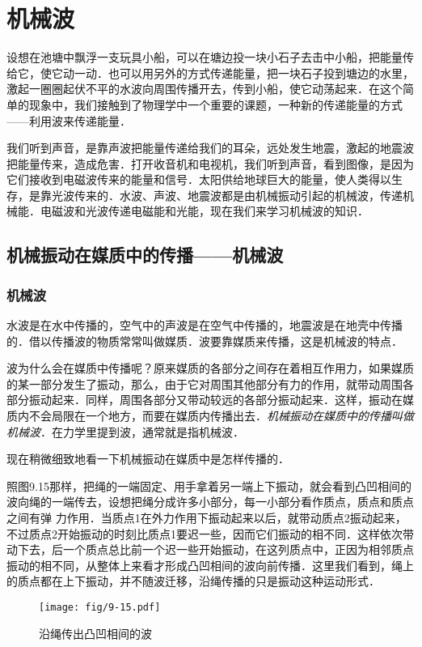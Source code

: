 \section{机械波}
设想在池塘中飘浮一支玩具小船，可以在塘边投一块小石子去击中小船，把能量传给它，使它动一动．也可以用另外的方式传递能量，把一块石子投到塘边的水里，激起一圈圈起伏不平的水波向周围传播开去，传到小船，使它动荡起来．在这个简单的现象中，我们接触到了物理学中一个重要的课题，一种新的传递能量的方式——利用波来传递能量．

我们听到声音，是靠声波把能量传递给我们的耳朵，远处发生地震，激起的地震波把能量传来，造成危害．打开收音机和电视机，我们听到声音，看到图像，是因为它们接收到电磁波传来的能量和信号．太阳供给地球巨大的能量，使人类得以生存，是靠光波传来的．水波、声波、地震波都是由机械振动引起的机械波，传递机械能．电磁波和光波传递电磁能和光能，现在我们来学习机械波的知识．


\subsection{机械振动在媒质中的传播——机械波}
\subsubsection{机械波} 

水波是在水中传播的，空气中的声波是在空气中传播的，地震波是在地壳中传播的．借以传播波的物质常常叫做媒质．波要靠媒质来传播，这是机械波的特点．


波为什么会在媒质中传播呢？原来媒质的各部分之间存在着相互作用力，如果媒质的某一部分发生了振动，那么，由于它对周围其他部分有力的作用，就带动周围各部分振动起来．同样，周围各部分又带动较远的各部分振动起来．这样，振动在媒质内不会局限在一个地方，而要在媒质内传播出去．\textit{机械振动在媒质中的传播叫做机械波}．在力学里提到波，通常就是指机械波．

现在稍微细致地看一下机械振动在媒质中是怎样传播的．

照图9.15那样，把绳的一端固定、用手拿着另一端上下振动，就会看到凸凹相间的波向绳的一端传去，设想把绳分成许多小部分，每一小部分看作质点，质点和质点之间有弹
力作用．当质点1在外力作用下振动起来以后，就带动质点2振动起来，不过质点2开始振动的时刻比质点1要迟一些，因而它们振动的相不同．这样依次带动下去，后一个质点总比前一个迟一些开始振动，在这列质点中，正因为相邻质点振动的相不同，从整体上来看才形成凸凹相间的波向前传播．这里我们看到，绳上的质点都在上下振动，并不随波迁移，沿绳传播的只是振动这种运动形式．

\begin{figure}[htp]\centering
\texttt{[image: fig/9-15.pdf]}
\caption{沿绳传出凸凹相间的波}
\end{figure}

